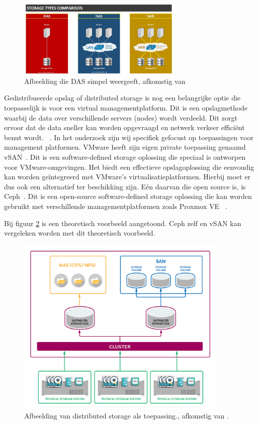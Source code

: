 \begin{figure}[h!]
    \centering
    \includegraphics[width=0.7\textwidth]{../onderzoek/DAS.jpg} 
    \caption{Afbeelding die DAS simpel weergeeft, afkomstig van \textcite{networkwalksStorage}}
    \label{fig:das}
\end{figure}
\FloatBarrier
Gedistribueerde opslag of distributed storage is nog een belangrijke optie die toepasselijk is voor een virtual managementplatform. Dit is een opslagmethode waarbij de data over verschillende servers (nodes) wordt verdeeld.
Dit zorgt ervoor dat de data sneller kan worden opgevraagd en netwerk verkeer efficiënt benut wordt. ~\autocite{patil2010unified}.
In het onderzoek zijn wij specifiek gefocust op toepassingen voor management platformen. VMware heeft zijn eigen private toepassing genaamd vSAN~\autocite{hogan2016essential}. Dit is een software-defined storage oplossing die speciaal is ontworpen voor VMware-omgevingen. Het biedt een effectieve opslagoplossing die eenvoudig kan worden geïntegreerd met VMware's virtualisatieplatformen.
Hierbij moet er dus ook een alternatief ter beschikking zijn. Eén daarvan die open source is, is Ceph~\autocite{weil2006ceph}. Dit is een open-source software-defined storage oplossing die kan worden gebruikt met verschillende managementplatformen zoals Proxmox VE ~\autocite{Proxmox}.

Bij figuur \ref{fig:das} is een theoretisch voorbeeld aangetoond. Ceph zelf en vSAN kan vergeleken worden met dit theoretisch voorbeeld.
\begin{figure}[h!]
  \centering
  \includegraphics[width=0.9\textwidth]{../onderzoek/dssep.png} 
  \caption{Afbeelding van distributed storage als toepassing., afkomstig van \textcite{pb2022storage}.}
  \label{fig:das}
\end{figure}